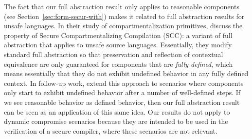 \documentclass[acmsmall,review,anonymous]{acmart}\settopmatter{printfolios=true,printccs=false,printacmref=false}
\begin{document}
The fact that our full abstraction result only applies to reasonable components (see Section~\ref{sec:form-secur-with}) makes it related to full abstraction results for unsafe languages.
In their study of compartmentalization primitives,  discuss the property of Secure Compartmentalizing Compilation (SCC): a variant of full abstraction that applies to unsafe source languages.
Essentially, they modify standard full abstraction so that preservation and reflection of contextual equivalence are only guaranteed for components that are {\itshape fully defined}, which means essentially that they do not exhibit undefined behavior in any fully defined context.
In follow-up work, \citet{DBLP:journals/corr/abs-1802-00588} extend this approach to scenarios where components only start to exhibit undefined behavior after a number of well-defined steps.
If we see reasonable behavior as defined behavior, then our full abstraction result can be seen as an application of this same idea.
Our results do not apply to dynamic compromise scenarios because they are intended to be used in the verification of a secure compiler, where these scenarios are not relevant.





\end{document}
